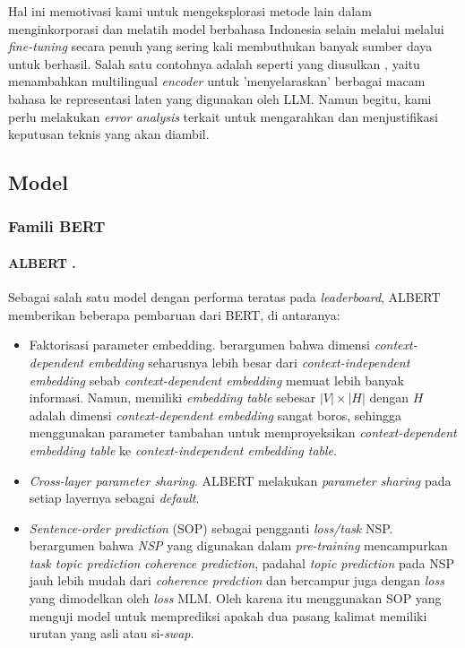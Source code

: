 \documentclass[11pt,a4paper]{article}
\begin{document}
Hal ini memotivasi kami untuk mengeksplorasi metode lain dalam menginkorporasi dan melatih model berbahasa Indonesia selain melalui melalui \textit{fine-tuning} secara penuh yang sering kali membuthukan banyak sumber daya untuk berhasil. Salah satu contohnya adalah seperti yang diusulkan \cite{Yoon2024}, yaitu menambahkan multilingual \textit{encoder} untuk 'menyelaraskan' berbagai macam bahasa ke representasi laten yang digunakan oleh LLM. Namun begitu, kami perlu melakukan \textit{error analysis} terkait untuk mengarahkan dan menjustifikasi keputusan teknis yang akan diambil.

\subsection{Model}

\subsubsection{Famili BERT}

\paragraph{ALBERT \cite{Lan2019}.} Sebagai salah satu model dengan performa teratas pada \textit{leaderboard}, ALBERT memberikan beberapa pembaruan dari BERT, di antaranya:

\begin{itemize}
  \item Faktorisasi parameter embedding.  \cite{Lan2019} berargumen bahwa dimensi \textit{context-dependent embedding} seharusnya lebih besar dari \textit{context-independent embedding} sebab \textit{context-dependent embedding} memuat lebih banyak informasi. Namun, memiliki \textit{embedding table} sebesar $|V| \times |H|$ dengan $H$ adalah dimensi \textit{context-dependent embedding} sangat boros, sehingga \cite{Lan2019} menggunakan parameter tambahan untuk memproyeksikan \textit{context-dependent embedding table} ke \textit{context-independent embedding table}.
  \item \textit{Cross-layer parameter sharing}. ALBERT melakukan \textit{parameter sharing} pada setiap layernya sebagai \textit{default}.
  \item  \textit{Sentence-order prediction} (SOP) sebagai pengganti \textit{loss/task} NSP. \cite{Lan2019} berargumen bahwa \textit{NSP} yang digunakan dalam \textit{pre-training} mencampurkan \textit{task topic prediction} \textit{coherence prediction}, padahal \textit{topic prediction} pada NSP jauh lebih mudah dari \textit{coherence predction} dan bercampur juga dengan \textit{loss} yang dimodelkan oleh \textit{loss} MLM. Oleh karena itu \cite{Lan2019} menggunakan SOP yang menguji model untuk memprediksi apakah dua pasang kalimat memiliki urutan yang asli atau si-\textit{swap}. 
\end{itemize}
\end{document}
